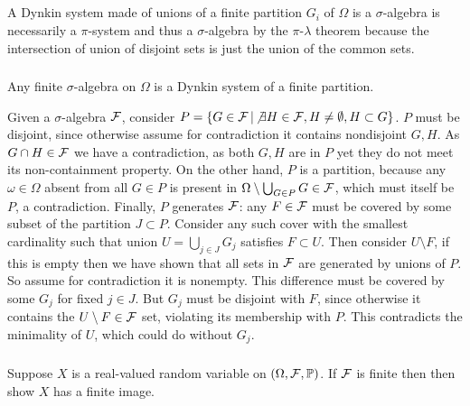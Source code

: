 \documentclass{article}
\begin{document}
     \subsection{}
     \subsubsection{}
     A Dynkin system made of unions of a finite partition \(G_i\) of \(\Omega\) is a \(\sigma\)-algebra is necessarily a \(\pi\)-system and thus a \(\sigma\)-algebra by the \(\pi\)-\(\lambda\) theorem because the intersection of union of disjoint sets is just the union of the common sets.

     \subsubsection{}

     Any finite \(\sigma\)-algebra on \(\Omega\) is a Dynkin system of a finite partition.

     Given a \(\sigma\)-algebra \(\mathcal{F}\), consider \(P=\left\{ G\in\mathcal{F} \,\middle|\, \not\exists H\in\mathcal{F},H\neq\emptyset, H\subset G \right\}\). \(P\) must be disjoint, since otherwise assume for contradiction it contains nondisjoint \(G,H\). As \(G\cap H\in \mathcal{F}\) we have a contradiction, as both \(G,H\) are in \(P\) yet they do not meet its non-containment property. On the other hand, \(P\) is a partition, because any \(\omega\in \Omega\) absent from all \(G\in P\) is present in \(\Omega\setminus \bigcup_{G\in P}G\in\mathcal{F}\), which must itself be \(P\), a contradiction. Finally, \(P\) generates \(\mathcal{F}\): any \(F\in\mathcal{F}\) must be covered by some subset of the partition \(J\subset P\). Consider any such cover with the smallest cardinality such that union \(U=\bigcup_{j\in J}G_j\) satisfies \(F\subset U\). Then consider \(U\setminus F\), if this is empty then we have shown that all sets in \(\mathcal{F}\) are generated by unions of \(P\). So assume for contradiction it is nonempty. This difference must be covered by some \(G_j\) for fixed \(j\in J\). But \(G_j\) must be disjoint with \(F\), since otherwise it contains the \(U\setminus F\in\mathcal{F}\) set, violating its membership with \(P\). This contradicts the minimality of \(U\), which could do without \(G_j\).
\label{basis}
     \subsubsection{}

     Suppose \(X\) is a real-valued random variable on \((\Omega,\mathcal{F},\operatorname{\mathbb{P}})\). If \(\mathcal{F}\) is finite then then show \(X\) has a finite image.
\end{document}
